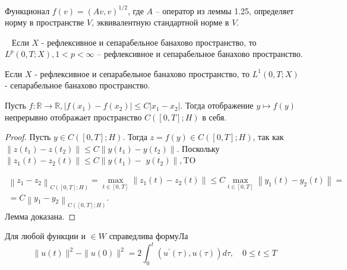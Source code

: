 \begin{lemma}
    \label{lm:1_7:27}\cite[238]{Zeidler1990a}
    Функционал $f(v)=(A v, v)^{1 / 2}$,
    где $A$ -- оператор из леммы 1.25,
    определяет норму в пространстве $V$,
    эквивалентную стандартной норме в $V$.
\end{lemma}

\begin{lemma}
    \label{lm:1_7:28}~\cite[411]{Zeidler1990a}
    Если $X$ - рефлексивное и сепарабельное банахово пространство,
    то $L^{p}(0, T ; X), 1<p<\infty$ -- рефлексивное
    и сепарабельное банахово пространство.
\end{lemma}

\begin{lemma}
    \label{lm:1_7:29}\cite[449]{Zeidler1990a}
    Если $X$ - рефлексивное и сепарабельное банахово пространство,
    то $L^{1}(0, T ; X)$ - сепарабельное банахово пространство.
\end{lemma}

\begin{lemma}
    \label{lm:1_7:30}
    Пусть $f: \mathbb{R} \rightarrow \mathbb{R},\left|f\left(x_{1}\right)
    -f\left(x_{2}\right)\right| \leq C\left|x_{1}-x_{2}\right|$.
    Тогда отображение $y \mapsto f(y)$ непрерывно
    отображает пространство $C([0, T] ; H)$ в себя.
\end{lemma}

\begin{proof}
    Пусть $y \in C([0, T] ; H)$.
    Тогда $z=f(y) \in C([0, T] ; H)$,
    так как $\left\|z\left(t_{1}\right)-z\left(t_{2}\right)\right\|
    \leq C\left\|y\left(t_{1}\right)-y\left(t_{2}\right)\right\|$.
    Поскольку $\left\|z_{1}(t)-z_{2}(t)\right\|
    \leq C \| y\left(t_{1}\right)-$ $y\left(t_{2}\right) \|, \mathrm{TO}$

    \[
        \begin{array}{r}
            \left\|z_{1}-z_{2}\right\|_{C([0, T] ; H)}=
            \max _{t \in[0, T]}\left\|z_{1}(t)
            -z_{2}(t)\right\| \leq C \max _{t \in[0, T]}\left\|y_{1}(t)
            -y_{2}(t)\right\| = \\
            =C\left\|y_{1}-y_{2}\right\|_{C([0, T] ; H)}.
        \end{array}
    \]
    Лемма доказана.
\end{proof}

\begin{lemma}
    \label{lm:1_7:31}\cite[423]{Zeidler1990a}
    Для любой функции и $\in W$ справедлива формуЛа
    \[
        \|u(t)\|^{2}-\|u(0)\|^{2}=2 \int_{0}^{t}\left(u^{\prime}(\tau),
        u(\tau)\right) d \tau, \quad 0 \leq t \leq T
    \]
\end{lemma}

